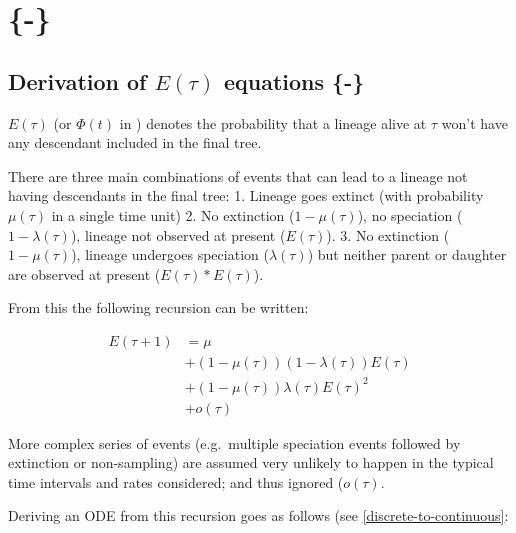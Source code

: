 \documentclass[
]{book}
\theoremstyle{definition}
\theoremstyle{definition}
\theoremstyle{definition}
\theoremstyle{definition}
\theoremstyle{remark}
\begin{document}
\hypertarget{morlon-2011}{%
\section{\texorpdfstring{\citet{morlon_reconciling_2011} \{-\}}{@morlon\_reconciling\_2011 \{-\}}}\label{morlon-2011}}

\hypertarget{derive-e}{%
\subsection{\texorpdfstring{Derivation of \(E(\tau)\) equations \{-\}}{Derivation of E(\textbackslash tau) equations \{-\}}}\label{derive-e}}

\(E(\tau)\) (or \(\Phi(t)\) in \citet{morlon_reconcling_2011}) denotes the probability that a lineage alive at \(\tau\) won't have any descendant included in the final tree.

There are three main combinations of events that can lead to a lineage not having descendants in the final tree:
1. Lineage goes extinct (with probability \(\mu(\tau)\) in a single time unit)
2. No extinction (\(1 - \mu(\tau)\)), no speciation (\(1 - \lambda(\tau)\)), lineage not observed at present (\(E(\tau)\)).
3. No extinction (\(1 - \mu(\tau)\)), lineage undergoes speciation (\(\lambda(\tau)\)) but neither parent or daughter are observed at present (\(E(\tau) * E(\tau)\)).

From this the following recursion can be written:

\begin{align}
  E(\tau + 1) &= \mu \\
  & + (1 - \mu(\tau))(1 - \lambda(\tau)) E(\tau) \\
  & + (1 - \mu(\tau)) \lambda(\tau) E(\tau)^2 \\
  & + o(\tau)
\end{align}

More complex series of events (e.g.~multiple speciation events followed by extinction or non-sampling) are assumed very unlikely to happen in the typical time intervals and rates considered; and thus ignored (\(o(\tau)\).

Deriving an ODE from this recursion goes as follows (see \ref{discrete-to-continuous}:
\end{document}
